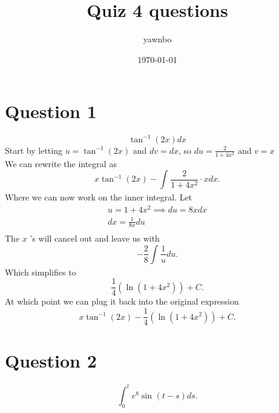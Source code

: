\documentclass[a4paper]{article}
\title{Quiz 4 questions}
\author{yawnbo}
\date{\today}
\begin{document}
\section{Question 1}
\[
  \tan^{-1}(2x)dx
\]
Start by letting $u=\tan^{-1}(2x)$ and $dv=dx$, so $du=\frac{2}{1+4x^2}$ and $v=x$ \\
We can rewrite the integral as
\[
x\tan^{-1}(2x)-\int_{}^{} \frac{2}{1+4x^2}\cdot xdx
.\]
Where we can now work on the inner integral. Let
\begin{gather*}
  u=1+4x^2 \implies du=8xdx \\
  dx= \frac{1}{8x}du\\
\end{gather*}
The $x$ 's will cancel out and leave us with
\[
-\frac{2}{8}\int_{}^{} \frac{1}{u}du 
.\] 
Which simplifies to
\[
\frac{1}{4}(\ln(1+4x^2))+C
.\] 
At which point we can plug it back into the original expression
\[
x\tan^{-1}(2x)-\frac{1}{4}(\ln(1+4x^2))+C
.\]
\newpage
\section{Question 2}
\[
\int_{0}^{t} e^{8} \sin^{}(t-s)ds
.\]
\end{document}
